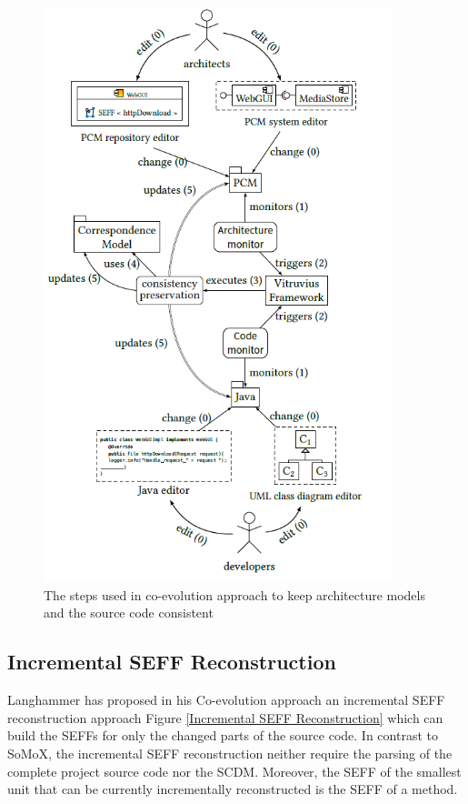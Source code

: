 \begin{figure}[h]
\centering
\includegraphics[width=0.9\textwidth]{figures/coevolution_approach}
\caption{The steps used in co-evolution approach to keep architecture models and the source code consistent \cite{langhammer2015co}}
\label{fig:coevoloution approach}
\end{figure}

\subsection{Incremental SEFF Reconstruction}
\label{sec:Incremental SEFF Reconstruction}
Langhammer has proposed in his Co-evolution approach an incremental SEFF reconstruction approach Figure \ref{Incremental SEFF Reconstruction} which can build the SEFFs for only the changed parts of the source code. In contrast to SoMoX, the incremental SEFF reconstruction neither require the parsing of the complete project source code nor the SCDM. Moreover, the SEFF of the smallest unit that can be currently incrementally reconstructed is the SEFF of a method. 

